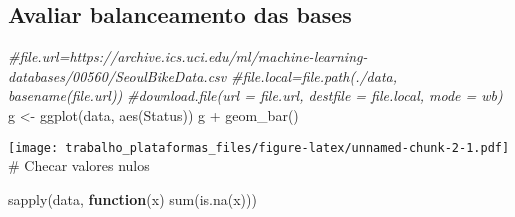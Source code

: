 \documentclass[
]{article}
\newenvironment{Shaded}{\begin{snugshade}}{\end{snugshade}}
\newcommand{\CommentTok}[1]{\textcolor[rgb]{0.56,0.35,0.01}{\textit{#1}}}
\newcommand{\ControlFlowTok}[1]{\textcolor[rgb]{0.13,0.29,0.53}{\textbf{#1}}}
\newcommand{\FunctionTok}[1]{\textcolor[rgb]{0.00,0.00,0.00}{#1}}
\newcommand{\NormalTok}[1]{#1}
\newcommand{\OtherTok}[1]{\textcolor[rgb]{0.56,0.35,0.01}{#1}}
\newcommand{\SpecialCharTok}[1]{\textcolor[rgb]{0.00,0.00,0.00}{#1}}
\begin{document}
\hypertarget{avaliar-balanceamento-das-bases}{%
\subsection{Avaliar balanceamento das
bases}\label{avaliar-balanceamento-das-bases}}

\begin{Shaded}
\begin{Highlighting}[]
\CommentTok{\#file.url=\textquotesingle{}https://archive.ics.uci.edu/ml/machine{-}learning{-}databases/00560/SeoulBikeData.csv\textquotesingle{}}
\CommentTok{\#file.local=file.path(\textquotesingle{}./data\textquotesingle{}, basename(file.url))}
\CommentTok{\#download.file(url = file.url, destfile = file.local, mode = \textquotesingle{}wb\textquotesingle{})}
\NormalTok{g }\OtherTok{\textless{}{-}} \FunctionTok{ggplot}\NormalTok{(data, }\FunctionTok{aes}\NormalTok{(Status))}
\NormalTok{g }\SpecialCharTok{+} \FunctionTok{geom\_bar}\NormalTok{()}
\end{Highlighting}
\end{Shaded}

\texttt{[image: trabalho\_plataformas\_files/figure-latex/unnamed-chunk-2-1.pdf]}
\# Checar valores nulos

\begin{Shaded}
\begin{Highlighting}[]
\FunctionTok{sapply}\NormalTok{(data, }\ControlFlowTok{function}\NormalTok{(x) }\FunctionTok{sum}\NormalTok{(}\FunctionTok{is.na}\NormalTok{(x)))}
\end{Highlighting}
\end{Shaded}
\end{document}
